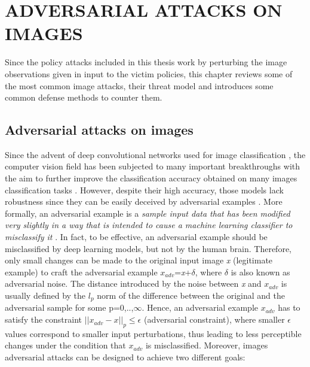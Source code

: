 
\chapter{ADVERSARIAL ATTACKS ON IMAGES}
\label{sec:ima}

Since the policy attacks included in this thesis work by perturbing the image observations given in input to the victim policies, this chapter reviews some of the most common image attacks, their threat model and introduces some common defense methods to counter them.

\section{Adversarial attacks on images}
Since the advent of deep convolutional networks used for image classification \cite{NIPS2012_4824}, the computer vision field has been subjected to many important breakthroughs with the aim to further improve the classification accuracy obtained on many images classification tasks \cite{he2015deep} \cite{zhang2020resnest}. However, despite their high accuracy, those models lack robustness since they can be easily deceived by adversarial examples \cite{goodfellow2014explaining}. More formally, an adversarial example is a \textit{sample input data that has been modified very slightly in a way that is intended to cause a machine learning classifier to misclassify it} \cite{kurakin2016adversarial}. In fact, to be effective, an adversarial example should be misclassified by deep learning models, but not by the human brain. Therefore, only small changes can be made to the original input image \textit{x} (legitimate example) to craft the adversarial example \(x_{adv}\)=\textit{x}+\(\delta\), where \(\delta\) is also known as adversarial noise. The distance introduced by the noise between \textit{x} and \(x_{adv}\) is usually defined by the \(l_{p}\) norm of the difference between the original and the adversarial sample for some p=0,..,\(\infty\). Hence, an adversarial example \(x_{adv}\) has to satisfy the constraint \(||x_{adv}-x||_p\leq \epsilon\) (adversarial constraint), where smaller \(\epsilon\) values correspond to smaller input perturbations, thus leading to less perceptible changes under the condition that \(x_{adv}\) is misclassified. Moreover, images adversarial attacks can be designed to achieve two different goals:
